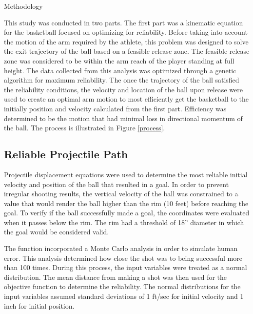 \begin{center}
\Large Methodology

\end{center}
\begin{multicols}{2}

This study was conducted in two parts. The first part was a kinematic equation for the basketball focused on optimizing for reliability.  Before taking into account the motion of the arm required by the athlete, this problem was designed to solve the exit trajectory of the ball based on a feasible release zone.  The feasible release zone was considered to be within the arm reach of the player standing at full height.  The data collected from this analysis was optimized through a genetic algorithm for maximum reliability.  The once the trajectory of the ball satisfied the reliability conditions, the velocity and location of the ball upon release were used to create an optimal arm motion to most efficiently get the basketball to the initially position and velocity calculated from the first part.  Efficiency was determined to be the motion that had minimal loss in directional momentum of the ball.  The process is illustrated in Figure \ref{process}.

 
\subsection*{Reliable Projectile Path}
Projectile displacement equations were used to determine the most reliable initial velocity and position of the ball that resulted in a goal.  In order to prevent irregular shooting results, the vertical velocity of the ball was constrained to a value that would render the ball higher than the rim (10 feet) before reaching the goal.  To verify if the ball successfully made a goal, the coordinates were evaluated when it passes below the rim.  The rim had a threshold of 18” diameter in which the goal would be considered valid.  

The function incorporated a Monte Carlo analysis in order to simulate human error. This analysis determined how close the shot was to being successful more than 100 times.  During this process, the input variables were treated as a normal distribution. The mean distance from making a shot was then used for the objective function to determine the reliability.  The normal distributions for the input variables assumed standard deviations of 1 ft/sec for initial velocity and 1 inch for initial position.


\end{multicols}
